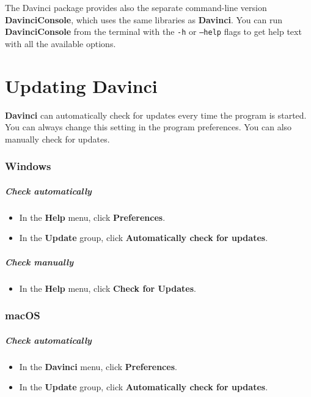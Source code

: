 The Davinci package provides also the separate command-line version \textbf{DavinciConsole}, which uses the same libraries as \textbf{Davinci}. You can run \textbf{DavinciConsole} from the terminal with the \texttt{-h} or \texttt{--help} flags to get help text with all the available options.

\section{Updating Davinci}

\textbf{Davinci} can automatically check for updates every time the program is started. You can always change this setting in the program preferences. You can also manually check for updates.

\subsubsection{Windows}

\subparagraph{Check automatically}

\begin{itemize}
	\item In the \textbf{Help} menu, click \textbf{Preferences}.
	\item In the \textbf{Update} group, click \textbf{Automatically check for updates}.
\end{itemize}

\subparagraph{Check manually}

\begin{itemize}
	\item In the \textbf{Help} menu, click \textbf{Check for Updates}.
\end{itemize}

\subsubsection{macOS}

\subparagraph{Check automatically}

\begin{itemize}
	\item In the \textbf{Davinci} menu, click \textbf{Preferences}.
	\item In the \textbf{Update} group, click \textbf{Automatically check for updates}.
\end{itemize}


